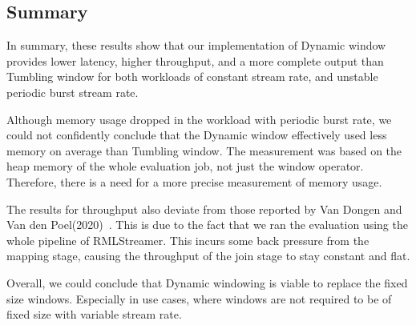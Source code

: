 \subsection{Summary}%
\label{sec:Result Summary}

In summary, these results show that our implementation of Dynamic window 
provides lower latency, higher throughput, and a more complete 
output than Tumbling window for both 
workloads of constant stream rate, and unstable periodic burst stream rate.

Although memory usage dropped in the workload with periodic burst rate, we 
could not confidently conclude that the Dynamic window effectively used less memory
on average than Tumbling window. The measurement was based on the heap memory of the 
whole evaluation job, not just the window operator. Therefore, there is a need for a 
more precise measurement of memory usage. 

The results for throughput also deviate from those reported by Van Dongen and Van den Poel(2020)~\cite{evalution_of_spe}. 
This is due to the fact that we ran the evaluation using the whole pipeline of RMLStreamer. This incurs some back pressure from the mapping stage, 
causing the throughput of the join stage to stay constant and flat.    

Overall, we could conclude that Dynamic windowing is viable to replace the fixed size 
windows. Especially in use 
cases, where windows are not required to be of fixed size with variable stream rate.  


